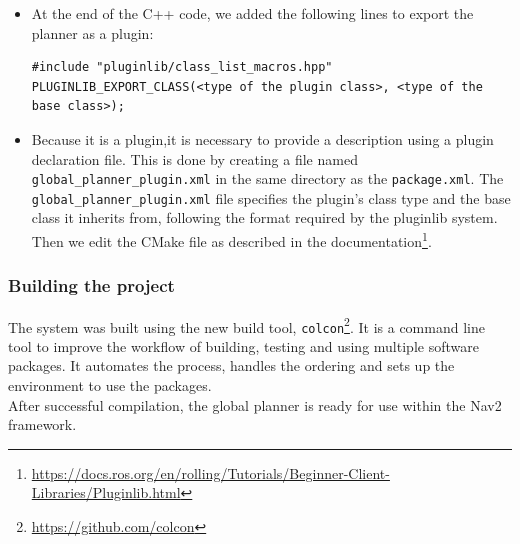 \begin{itemize}
\begin{itemize}
		\item \texttt{deactivate()}: Called when the node enters \texttt{on\_deactivate} state. This method is used for implementing operations which are necessary before planner goes to an inactive state. In our case, this method is not used and is left empty.
		\item \texttt{cleanup()}: Called when the node enters \texttt{on\_cleanup} state. This method is used for cleaning up resources which are created for the planner. In our case we destroys the allocated memory used by \texttt{state\_map} and \texttt{dstar}. 
		\item \texttt{createPlan()}: Invoked when the planner server requests a global plan between a start and goal pose. It required the start and goal position as\\ \texttt{geometry\_msgs::msg::PoseStamped} and return a path \texttt{nav\_msgs::msg::Path}. It replace the \texttt{makePlan} used in ROS 1.
	\end{itemize}
	\item At the end of the C++ code,  we added the following lines to export the planner as a plugin:\\
\begin{listing} [ht!]
\begin{verbatim} 
#include "pluginlib/class_list_macros.hpp"
PLUGINLIB_EXPORT_CLASS(<type of the plugin class>, <type of the base class>);
\end{verbatim}
\end{listing}
	\item Because it is a plugin,it is necessary to provide a description using a plugin declaration file. This is done by creating a file named \texttt{global\_planner\_plugin.xml} in the same directory as the \texttt{package.xml}.
	The \texttt{global\_planner\_plugin.xml} file specifies the plugin's class type and the base class it inherits from, following the format required by the pluginlib system. Then we edit the CMake file as described in the documentation\footnote{\href{https://docs.ros.org/en/rolling/Tutorials/Beginner-Client-Libraries/Pluginlib.html}{https://docs.ros.org/en/rolling/Tutorials/Beginner-Client-Libraries/Pluginlib.html}}.
\end{itemize}
\subsubsection{Building the project}
The system was built using the new build tool, \texttt{colcon}\footnote{\href{https://github.com/colcon}{https://github.com/colcon}}. It is a command line tool to improve the workflow of building, testing and using multiple software packages. It automates the process, handles the ordering and sets up the environment to use the packages.\\
After successful compilation, the global planner is ready for use within the Nav2 framework.

